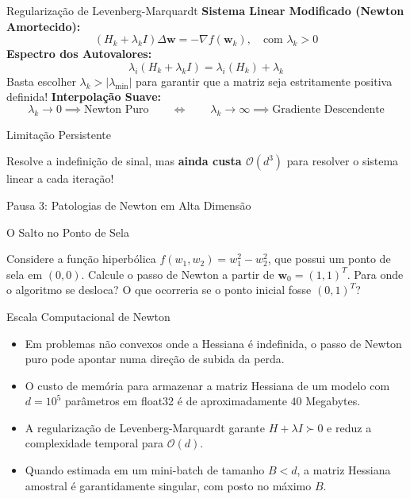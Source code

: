 \documentclass[aspectratio=169, 10pt]{beamer}
\newenvironment{callouttip}[1][Dica]{%
  \begin{exampleblock}{#1}%
}{%
  \end{exampleblock}%
}
\newenvironment{calloutwarning}[1][Atenção]{%
  \begin{alertblock}{#1}%
}{%
  \end{alertblock}%
}
\newcommand{\qmark}{\textbf{$\square$}}
\begin{document}
\begin{frame}{Regularização de Levenberg-Marquardt}
  \textbf{Sistema Linear Modificado (Newton Amortecido):}
  \[(H_k + \lambda_k I)\Delta\mathbf{w} = -\nabla f(\mathbf{w}_k), \quad \text{com } \lambda_k > 0\]
  \vspace{0.2cm}
  \textbf{Espectro dos Autovalores:}
  \[\lambda_i(H_k + \lambda_k I) = \lambda_i(H_k) + \lambda_k\]
  Basta escolher $\lambda_k > |\lambda_{\min}|$ para garantir que a matriz seja estritamente positiva definida!
  \vspace{0.2cm}
  \textbf{Interpolação Suave:}
  \[\lambda_k \to 0 \implies \text{Newton Puro} \qquad\Longleftrightarrow\qquad \lambda_k \to \infty \implies \text{Gradiente Descendente}\]
  \vspace{0.3cm}
  \begin{calloutwarning}[Limitação Persistente]
    Resolve a indefinição de sinal, mas \textbf{ainda custa $\mathcal{O}(d^3)$} para resolver o sistema linear a cada iteração!
  \end{calloutwarning}
\end{frame}

\begin{frame}{Pausa 3: Patologias de Newton em Alta Dimensão}
  \begin{callouttip}[O Salto no Ponto de Sela]
    Considere a função hiperbólica $f(w_1, w_2) = w_1^2 - w_2^2$, que possui um ponto de sela em $(0, 0)$. Calcule o passo de Newton a partir de $\mathbf{w}_0 = (1, 1)^T$. Para onde o algoritmo se desloca? O que ocorreria se o ponto inicial fosse $(0, 1)^T$?
  \end{callouttip}

  \begin{callouttip}[Escala Computacional de Newton]
    \begin{itemize}
      \item[\qmark] Em problemas não convexos onde a Hessiana é indefinida, o passo de Newton puro pode apontar numa direção de subida da perda.
      \item[\qmark] O custo de memória para armazenar a matriz Hessiana de um modelo com $d = 10^5$ parâmetros em float32 é de aproximadamente $40$ Megabytes.
      \item[\qmark] A regularização de Levenberg-Marquardt garante $H + \lambda I \succ 0$ e reduz a complexidade temporal para $\mathcal{O}(d)$.
      \item[\qmark] Quando estimada em um mini-batch de tamanho $B < d$, a matriz Hessiana amostral é garantidamente singular, com posto no máximo $B$.
    \end{itemize}
  \end{callouttip}
\end{frame}
\end{document}
